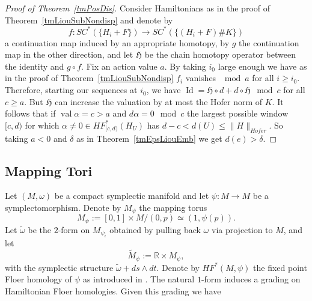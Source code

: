 \documentclass[11pt]{amsart}
\newcommand{\R}{\mathbb{R}}
\DeclareMathOperator{\id}{Id}
\DeclareMathOperator{\val}{val}
\theoremstyle{definition}
\theoremstyle{remark}
\begin{document}
\begin{proof}[Proof of Theorem~\ref{tmPosDis}]
Consider Hamiltonians as in the proof of Theorem~\ref{tmLiouSubNondisp} and denote by
\[
f:SC^*(\{H_i+F\})\to SC^*(\{(H_i+F)\#K\})
\]
a continuation map induced by an appropriate homotopy, by $g$ the continuation map in the other direction, and let $\mathfrak{H}$ be the chain homotopy operator between the identity and $g\circ f$. Fix an action value $a$. By taking $i_0$ large enough we have as in the proof of Theorem~\ref{tmLiouSubNondisp} $f_i$ vanishes $\mod a$ for all $i\geq i_0$. Therefore, starting our sequences at $i_0$, we have $\id=\mathfrak{H}\circ d+d\circ \mathfrak{H}\mod c$ for all $c\geq a$.  But $\mathfrak{H}$ can increase the valuation by at most the Hofer norm of $K$. It follows that if $\val\alpha=c>a$ and $d\alpha=0\mod c$ the largest possible window $[c,d)$ for which $\alpha\neq0\in HF^*_{[c,d)}(H_U)$ has $d-c< d(U)\leq\|H\|_{Hofer}$. So taking $a<0$ and $\delta$ as in Theorem~\ref{tmEpsLiouEmb} we get $d(e)>\delta$.
\end{proof}

\subsection{Mapping Tori}\label{subSecMappingTorus}

Let $(M,\omega)$ be a compact symplectic manifold and let $\psi:M\to M$ be a symplectomorphism. Denote by $M_\psi$ the mapping torus
 \[
M_{\psi}:=[0,1]\times M/(0,p)\simeq (1,\psi(p)).
\]
Let $\tilde{\omega} $ be the $2$-form on $M_{\psi_i}$ obtained by pulling back $\omega$ via projection to $M$, and let
\[
\tilde{M}_{\psi}:=\R\times M_{\psi},
\]
with the symplectic structure $\tilde{\omega}+ds\wedge dt$. Denote by $HF^*(M,\psi)$ the fixed point Floer homology of $\psi$ as introduced in \cite{DS94}. The natural $1$-form induces a grading on Hamiltonian Floer homologies. Given this grading we have
\end{document}
